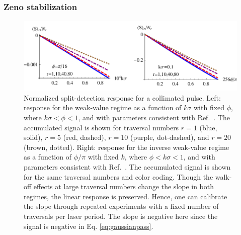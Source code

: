 \subsubsection{Zeno stabilization}\label{sec:zeno}
\begin{figure}[t]
  \begin{center}
    \includegraphics[width=6in]{PulsedRecycling/Figures/responseplot.pdf}
  \end{center}
  \caption{Normalized split-detection response for a collimated pulse.  Left: response for the weak-value regime as a function of $k\sigma$ with fixed $\phi$, where $k\sigma < \phi < 1$, and with parameters consistent with Ref.~\cite{Dixon2009}.  The accumulated signal is shown for traversal numbers $r=1$ (blue, solid), $r=5$ (red, dashed), $r=10$ (purple, dot-dashed), and $r=20$ (brown, dotted).  Right: response for the inverse weak-value regime as a function of $\phi / \pi$ with fixed $k$, where $\phi < k\sigma < 1$, and with parameters consistent with Ref.~\cite{Starling2010a,Starling2010b}.  The accumulated signal is shown for the same traversal numbers and color coding.  Though the walk-off effects at large traversal numbers change the slope in both regimes, the linear response is preserved.  Hence, one can calibrate the slope through repeated experiments with a fixed number of traversals per laser period.  The slope is negative here since the signal is negative in Eq. \eqref{eq:gaussianpass}.}
  \label{fig:collimatedsplitresponse}
\end{figure}


